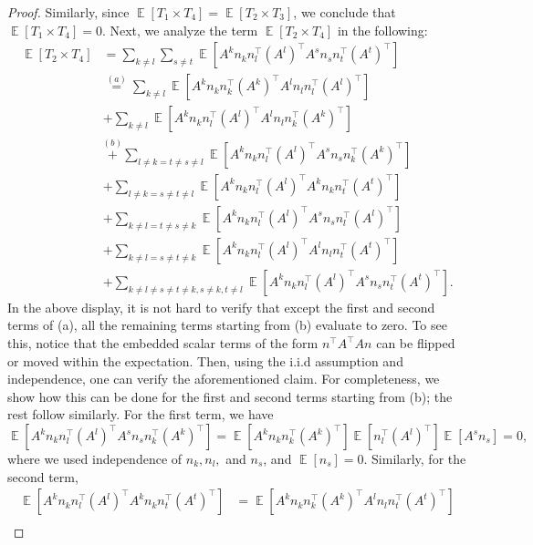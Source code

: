 \documentclass[letterpaper, 11 pt]{article}
\DeclareMathOperator{\E}{\mathbb{E}}
\begin{document}
\begin{proof}
    Similarly, since $\E[T_1 \times T_4] = \E[T_2 \times T_3]$, we conclude that $\E[T_1 \times T_4] = 0$. Next, we analyze the term $\E[T_2 \times T_4]$ in the following:
    \begin{align*}
        \E[T_2 \times T_4] & = \sum_{k \neq l} \sum_{s \neq t} \E\left[A^kn_kn_l^{\top}(A^l)^{\top} A^sn_sn_t^{\top}(A^t)^{\top}\right] \\
        & \overset{(a)}{=} \sum_{k\neq l} \E\left[ A^kn_kn_k^{\top}(A^k)^{\top} A^ln_ln_l^{\top}(A^l)^{\top}\right] \\
        & + \sum_{k\neq l} \E\left[ A^kn_kn_l^{\top}(A^l)^{\top} A^ln_ln_k^{\top}(A^k)^{\top}\right] \\
        & \overset{(b)}{+} \sum_{l \neq k = t \neq s \neq l} \E\left[ A^kn_kn_l^{\top}(A^l)^{\top} A^sn_sn_k^{\top}(A^k)^{\top}\right] \\
        & + \sum_{l \neq k = s \neq t \neq l} \E\left[ A^kn_kn_l^{\top}(A^l)^{\top} A^kn_kn_t^{\top}(A^t)^{\top}\right] \\
        & + \sum_{k \neq l = t \neq s \neq k} \E\left[ A^kn_kn_l^{\top}(A^l)^{\top} A^sn_sn_l^{\top}(A^l)^{\top}\right] \\
        & + \sum_{k \neq l = s \neq t \neq k} \E\left[ A^kn_kn_l^{\top}(A^l)^{\top} A^ln_ln_t^{\top}(A^t)^{\top}\right] \\
        & + \sum_{k \neq l \neq s \neq t \neq k, s \neq k, t \neq l} \E\left[ A^kn_kn_l^{\top}(A^l)^{\top} A^sn_sn_t^{\top}(A^t)^{\top}\right].
    \end{align*}
    In the above display, it is not hard to verify that except the first and second terms of (a), all the remaining terms starting from (b) evaluate to zero. To see this, notice that the embedded scalar terms of the form $n^{\top}A^{\top} An$ can be flipped or moved within the expectation. Then, using the i.i.d assumption and independence, one can verify the aforementioned claim. For completeness, we show how this can be done for the first and second terms starting from (b); the rest follow similarly. For the first term, we have
$$ \E\left[ A^kn_k n_l^{\top}(A^l)^{\top} A^sn_sn_k^{\top}(A^k)^{\top}\right] =  \E\left[ A^kn_k n_k^{\top} (A^k)^{\top}\right] \E\left[ n_l^{\top}(A^l)^{\top} \right] \E\left[ A^sn_s  \right] =0,$$
where we used independence of $n_k, n_l,$ and $n_s$, and $\E\left[ n_s \right]=0.$ Similarly, for the second term,  
\begin{align*}
    \E\left[ A^kn_kn_l^{\top}(A^l)^{\top} A^kn_kn_t^{\top}(A^t)^{\top}\right] &= \E\left[ A^kn_k n_k^{\top}(A^k)^{\top} A^l n_l n_t^{\top}(A^t)^{\top}\right] \\

\end{align*}
\end{proof}
\end{document}
